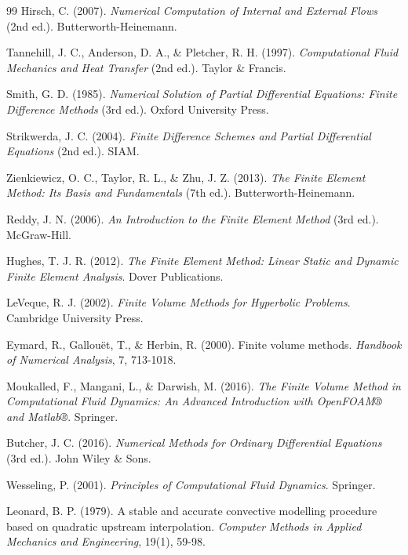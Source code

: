 \begin{thebibliography}{99}
Hirsch, C. (2007). \emph{Numerical Computation of Internal and External Flows} (2nd ed.). Butterworth-Heinemann.

Tannehill, J. C., Anderson, D. A., \& Pletcher, R. H. (1997). \emph{Computational Fluid Mechanics and Heat Transfer} (2nd ed.). Taylor \& Francis.

Smith, G. D. (1985). \emph{Numerical Solution of Partial Differential Equations: Finite Difference Methods} (3rd ed.). Oxford University Press.

Strikwerda, J. C. (2004). \emph{Finite Difference Schemes and Partial Differential Equations} (2nd ed.). SIAM.

Zienkiewicz, O. C., Taylor, R. L., \& Zhu, J. Z. (2013). \emph{The Finite Element Method: Its Basis and Fundamentals} (7th ed.). Butterworth-Heinemann.

Reddy, J. N. (2006). \emph{An Introduction to the Finite Element Method} (3rd ed.). McGraw-Hill.

Hughes, T. J. R. (2012). \emph{The Finite Element Method: Linear Static and Dynamic Finite Element Analysis}. Dover Publications.

LeVeque, R. J. (2002). \emph{Finite Volume Methods for Hyperbolic Problems}. Cambridge University Press.

Eymard, R., Gallouët, T., \& Herbin, R. (2000). Finite volume methods. \emph{Handbook of Numerical Analysis}, 7, 713-1018.

Moukalled, F., Mangani, L., \& Darwish, M. (2016). \emph{The Finite Volume Method in Computational Fluid Dynamics: An Advanced Introduction with OpenFOAM® and Matlab®}. Springer.

Butcher, J. C. (2016). \emph{Numerical Methods for Ordinary Differential Equations} (3rd ed.). John Wiley \& Sons.

Wesseling, P. (2001). \emph{Principles of Computational Fluid Dynamics}. Springer.

Leonard, B. P. (1979). A stable and accurate convective modelling procedure based on quadratic upstream interpolation. \emph{Computer Methods in Applied Mechanics and Engineering}, 19(1), 59-98.


\end{thebibliography}

